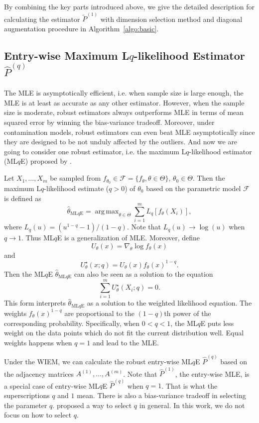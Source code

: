 \documentclass[a4paper]{article}
\DeclareMathOperator*{\argmax}{arg\,max}
\renewcommand{\hat}{\widehat}
\begin{document}
By combining the key parts introduced above, we give the detailed description for calculating the estimator $\widetilde{P}^{(1)}$ with dimension selection method and diagonal augmentation procedure in Algorithm~\ref{algo:basic}.




\subsection{Entry-wise Maximum L$q$-likelihood Estimator $\hat{P}^{(q)}$}

The MLE is asymptotically efficient, i.e. when sample size is large enough, the MLE is at least as accurate as any other estimator. However, when the sample size is moderate, robust estimators always outperforms MLE in terms of mean squared error by winning the bias-variance tradeoff. Moreover, under contamination models, robust estimators can even beat MLE asymptotically since they are designed to be not unduly affected by the outliers. And now we are going to consider one robust estimator, i.e. the maximum L$q$-likelihood estimator (ML$q$E) proposed by \citet{ferrari2010}.

Let $X_1, \dotsc, X_m$ be sampled from $f_{\theta_0} \in \mathcal{F} = \{ f_{\theta}, \theta \in \Theta \}$, $\theta_0 \in \Theta$. Then the maximum L$q$-likelihood estimate ($q > 0$) of $\theta_0$ based on the parametric model $\mathcal{F}$ is defined as
\[
	\hat{\theta}_{\mathrm{ML}q\mathrm{E}} = \argmax_{\theta \in \Theta} \sum_{i=1}^m L_q[f_{\theta}(X_i)],
\]
where $L_q(u) = (u^{1-q} - 1)/(1- q)$.
Note that $L_q(u) \to \log(u)$ when $q \to 1$. Thus ML$q$E is a generalization of MLE.
Moreover, define
\[
	U_{\theta}(x) = \nabla_{\theta} \log f_{\theta}(x)
\]
and
\[
	U^{\star}_{\theta}(x; q) = U_{\theta}(x) f_{\theta}(x)^{1-q}.
\]
Then the ML$q$E $\hat{\theta}_{\mathrm{ML}q\mathrm{E}}$ can also be seen as a solution to the equation
\[
	\sum_{i=1}^m U^{\star}_{\theta}(X_i; q) = 0.
\]
This form interprets $\hat{\theta}_{\mathrm{ML}q\mathrm{E}}$ as a solution to the weighted likelihood equation. The weights $f_{\theta}(x)^{1-q}$ are proportional to the $(1-q)$th power of the corresponding probability. Specifically, when $0 < q < 1$, the ML$q$E puts less weight on the data points which do not fit the current distribution well. Equal weights happens when $q=1$ and lead to the MLE.

Under the WIEM, we can calculate the robust entry-wise ML$q$E $\hat{P}^{(q)}$ based on the adjacency matrices $A^{(1)}, \dotsc, A^{(m)}$. Note that $\hat{P}^{(1)}$, the entry-wise MLE, is a special case of entry-wise ML$q$E $\hat{P}^{(q)}$ when $q = 1$. That is what the superscriptions $q$ and $1$ mean. There is also a bias-variance tradeoff in selecting the parameter $q$. \citet{qin2013robust} proposed a way to select $q$ in general. In this work, we do not focus on how to select $q$.
\end{document}
